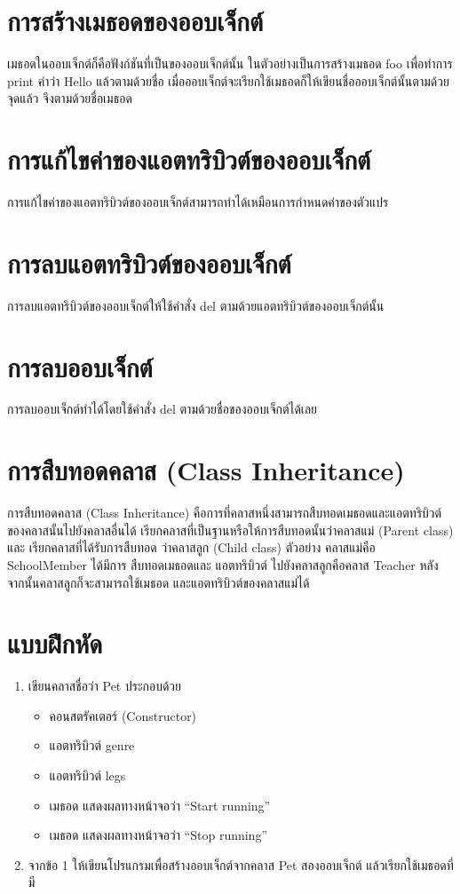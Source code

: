\section{การสร้างเมธอดของออบเจ็กต์}

เมธอดในออบเจ็กต์ก็คือฟังก์ชันที่เป็นของออบเจ็กต์นั้น ในตัวอย่างเป็นการสร้างเมธอด foo เพื่อทำการ print คำว่า Hello แล้วตามด้วยชื่อ เมื่อออบเจ็กต์จะเรียกใช้เมธอดก็ให้เขียนชื่อออบเจ็กต์นั้นตามด้วยจุดแล้ว จึงตามด้วยชื่อเมธอด

\section{การแก้ไขค่าของแอตทริบิวต์ของออบเจ็กต์}

การแก้ไขค่าของแอตทริบิวต์ของออบเจ็กต์สามารถทำได้เหมือนการกำหนดค่าของตัวแปร

\section{การลบแอตทริบิวต์ของออบเจ็กต์}

การลบแอตทริบิวต์ของออบเจ็กต์ให้ใช้คำสั่ง del ตามด้วยแอตทริบิวต์ของออบเจ็กต์นั้น

\section{การลบออบเจ็กต์}

การลบออบเจ็กต์ทำได้โดยใช้คำสั่ง del ตามด้วยชื่อของออบเจ็กต์ได้เลย

\section{การสืบทอดคลาส (Class Inheritance)}
การสืบทอดคลาส (Class Inheritance) คือการที่คลาสหนึ่งสามารถสืบทอดเมธอดและแอตทริบิวต์ ของคลาสนั้นไปยังคลาสอื่นได้ เรียกคลาสที่เป็นฐานหรือให้การสืบทอดนั้นว่าคลาสแม่ (Parent class) และ เรียกคลาสที่ได้รับการสืบทอด ว่าคลาสลูก (Child class) ตัวอย่าง คลาสแม่คือ SchoolMember ได้มีการ สืบทอดเมธอดและ แอตทริบิวต์ ไปยังคลาสลูกคือคลาส Teacher หลังจากนั้นคลาสลูกก็จะสามารถใช้เมธอด และแอตทริบิวต์ของคลาสแม่ได้

\section{แบบฝึกหัด}
\begin{enumerate} 
\item 	เขียนคลาสชื่อว่า Pet ประกอบด้วย
	\begin{itemize}
	\item 	คอนสตรัคเตอร์ (Constructor)
	\item 	แอตทริบิวต์ genre
	\item 	แอตทริบิวต์ legs
	\item 	เมธอด  แสดงผลทางหน้าจอว่า “Start running”
	\item 	เมธอด  แสดงผลทางหน้าจอว่า “Stop running”
	\end{itemize}
\item 	 จากข้อ 1 ให้เขียนโปรแกรมเพื่อสร้างออบเจ็กต์จากคลาส Pet สองออบเจ็กต์ แล้วเรียกใช้เมธอดที่มี
\end{enumerate}